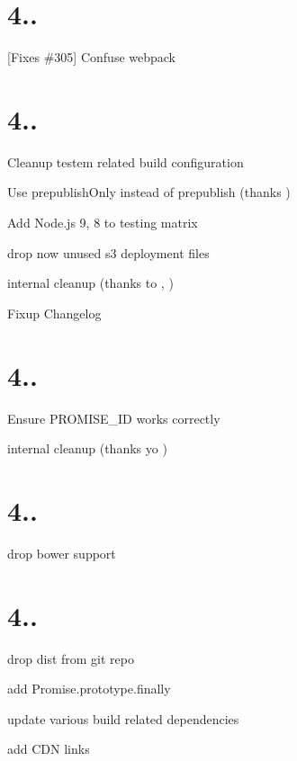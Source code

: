 \section*{4..}


\begin{DoxyItemize}
\item \mbox{[}Fixes \#305\mbox{]} Confuse webpack
\end{DoxyItemize}

\section*{4..}


\begin{DoxyItemize}
\item Cleanup testem related build configuration
\item Use {\ttfamily prepublish\+Only} instead of {\ttfamily prepublish} (thanks )
\item Add Node.\+js 9, 8 to testing matrix
\item drop now unused s3 deployment files
\item internal cleanup (thanks to , )
\item Fixup Changelog
\end{DoxyItemize}

\section*{4..}


\begin{DoxyItemize}
\item Ensure P\+R\+O\+M\+I\+S\+E\+\_\+\+ID works correctly
\item internal cleanup (thanks yo )
\end{DoxyItemize}

\section*{4..}


\begin{DoxyItemize}
\item drop bower support
\end{DoxyItemize}

\section*{4..}


\begin{DoxyItemize}
\item drop {\ttfamily dist} from git repo
\item add {\ttfamily Promise.\+prototype.\+finally}
\item update various build related dependencies
\item add C\+DN links
\end{DoxyItemize}

